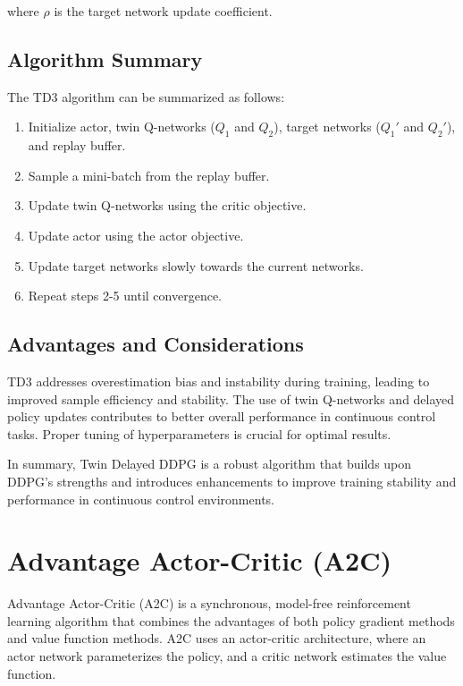 \documentclass[conference]{IEEEtran}
\begin{document}
where $\rho$ is the target network update coefficient.

\subsection{Algorithm Summary}

The TD3 algorithm can be summarized as follows:

\begin{enumerate}
  \item Initialize actor, twin Q-networks ($Q_1$ and $Q_2$), target networks ($Q_1'$ and $Q_2'$), and replay buffer.
  \item Sample a mini-batch from the replay buffer.
  \item Update twin Q-networks using the critic objective.
  \item Update actor using the actor objective.
  \item Update target networks slowly towards the current networks.
  \item Repeat steps 2-5 until convergence.
\end{enumerate}

\subsection{Advantages and Considerations}

TD3 addresses overestimation bias and instability during training, leading to improved sample efficiency and stability. The use of twin Q-networks and delayed policy updates contributes to better overall performance in continuous control tasks. Proper tuning of hyperparameters is crucial for optimal results.

In summary, Twin Delayed DDPG is a robust algorithm that builds upon DDPG's strengths and introduces enhancements to improve training stability and performance in continuous control environments.

\section{Advantage Actor-Critic (A2C)}

Advantage Actor-Critic (A2C) is a synchronous, model-free reinforcement learning algorithm that combines the advantages of both policy gradient methods and value function methods. A2C uses an actor-critic architecture, where an actor network parameterizes the policy, and a critic network estimates the value function.
\end{document}
